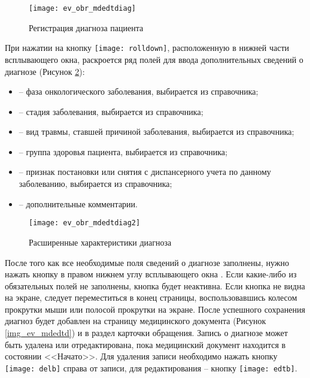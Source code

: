 {\begin{enumerate}
  \begin{figure}[ht!]\centering
    \texttt{[image: ev\_obr\_mdedtdiag]}
    \caption{Регистрация диагноза пациента}
    \label{img_ev_obr_mdedtdiag}
  \end{figure}
  
 При нажатии на кнопку \texttt{[image: rolldown]}, расположенную в нижней части всплывающего окна, раскроется ряд полей для ввода дополнительных сведений о диагнозе (Рисунок \ref{img_ev_obr_mdedtdiag2}):
 \begin{itemize}
  \item {} -- фаза онкологического заболевания, выбирается из справочника;
  \item {} -- стадия заболевания, выбирается из справочника;
  \item {} -- вид травмы, ставшей причиной заболевания, выбирается из справочника;
  \item {} -- группа здоровья пациента, выбирается из справочника;
  \item {} -- признак постановки или снятия с диспансерного учета по данному заболеванию, выбирается из справочника;
  \item {} -- дополнительные комментарии.
 \end{itemize}
 
   \begin{figure}[ht!]\centering
   	\texttt{[image: ev\_obr\_mdedtdiag2]}
   	\caption{Расширенные характеристики диагноза}
   	\label{img_ev_obr_mdedtdiag2}
   \end{figure}
   
 После того как все необходимые поля сведений о диагнозе заполнены, нужно нажать кнопку  в правом нижнем углу всплывающего окна . Если какие-либо из обязательных полей не заполнены, кнопка будет неактивна. Если кнопка не видна на экране, следует переместиться в конец страницы, воспользовавшись колесом прокрутки мыши или полосой прокрутки на экране. После успешного сохранения диагноз будет добавлен на страницу медицинского документа (Рисунок \ref{img_ev_mdedtd}) и в раздел  карточки обращения. Запись о диагнозе может быть удалена или отредактирована, пока медицинский документ находится в состоянии <<Начато>>. Для удаления записи необходимо нажать кнопку \texttt{[image: delb]} справа от записи, для редактирования -- кнопку \texttt{[image: edtb]}. 
  

\end{enumerate}}
